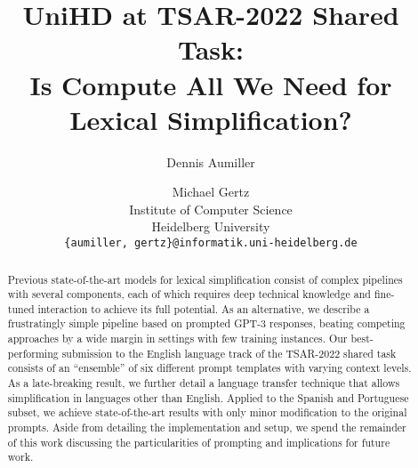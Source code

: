 \documentclass[11pt]{article}
\title{UniHD at TSAR-2022 Shared Task:\\ Is Compute All We Need for Lexical Simplification?}
\author{Dennis Aumiller \and Michael Gertz \\
  Institute of Computer Science \\
  Heidelberg University \\
  \texttt{\{aumiller, gertz\}@informatik.uni-heidelberg.de}}
\begin{document}
\maketitle
\begin{abstract}
Previous state-of-the-art models for lexical simplification consist of complex pipelines with several components, each of which requires deep technical knowledge and fine-tuned interaction to achieve its full potential.
As an alternative, we describe a frustratingly simple pipeline based on prompted GPT-3 responses, beating competing approaches by a wide margin in settings with few training instances.
Our best-performing submission to the English language track of the TSAR-2022 shared task consists of an ``ensemble'' of six different prompt templates with varying context levels. As a late-breaking result, we further detail a language transfer technique that allows simplification in languages other than English. Applied to the Spanish and Portuguese subset, we achieve state-of-the-art results with only minor modification to the original prompts.
Aside from detailing the implementation and setup, we spend the remainder of this work discussing the particularities of prompting and implications for future work.
\end{abstract}
\end{document}
